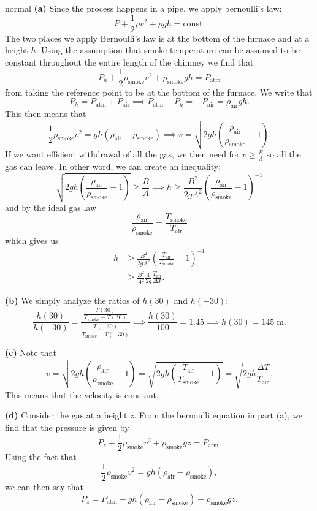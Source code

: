 \begin{solution}{normal}
\textbf{(a)} Since the process happens in a pipe, we apply bernoulli's law:
\[P + \frac{1}{2}\rho v^2 + \rho gh = \text{const.}\]
The two places we apply Bernoulli's law is at the bottom of the furnace and at a height $h$. Using the assumption that smoke temperature can be assumed to be constant throughout the entire length of the chimney we find that 
\[P_h + \frac{1}{2}\rho_{\text{smoke}}v^2 + \rho_{\text{smoke}} gh  = P_{\text{atm}}\]
from taking the reference point to be at the bottom of the furnace. We write that 
\[P_h = P_{\text{atm}} + P_{\text{air}}\implies P_{\text{atm}} - P_h = -P_{\text{air}} = \rho_{\text{air}} gh.\]
This then means that 
\[\frac{1}{2}\rho_{\text{smoke}} v^2 = gh (\rho_{\text{air}} - \rho_{\text{smoke}})\implies v = \sqrt{2gh \left(\frac{\rho_{\text{air}}}{\rho_{\text{smoke}}} - 1\right)}.\]
If we want efficient withdrawal of all the gas, we then need for $v \geq \frac{B}{A}$ so all the gas can leave. In other word, we can create an inequality:
\[\sqrt{2gh \left(\frac{\rho_{\text{air}}}{\rho_{\text{smoke}}} - 1\right)} \geq \frac{B}{A}\implies h \geq \frac{B^2}{2gA^2} \left(\frac{\rho_{\text{air}}}{\rho_{\text{smoke}}} - 1\right)^{-1}\]
and by the ideal gas law 
\[\frac{\rho_{\text{air}}}{\rho_{\text{smoke}}} = \frac{T_{\text{smoke}}}{T_{\text{air}}}\]
which gives us 
\begin{align*}
h &\geq \frac{B^2}{2gA^2} \left(\frac{T_{\text{air}}}{T_{\text{smoke}}} - 1\right)^{-1} \\
&\geq \frac{B^2}{A^2}\frac{1}{2g}\frac{T_{\text{air}}}{\Delta T}.
\end{align*}
\vspace{3mm}

\noindent \textbf{(b)} We simply analyze the ratios of $h(30)$ and $h(-30)$:
\[\frac{h (30)}{h(-30)} = \frac{\frac{T(30)}{T_{\text{smoke}} - T(30)}}{\frac{T(-30)}{T_{\text{smoke}} - T(-30)}}\implies \frac{h(30)}{100} = 1.45\implies h(30) = 145\;\mathrm{m}.\]
\vspace{3mm}

\noindent \textbf{(c)} Note that 
\[ v = \sqrt{2gh \left(\frac{\rho_{\text{air}}}{\rho_{\text{smoke}}} - 1\right)} = \sqrt{2gh \left(\frac{T_{\text{air}}}{T_{\text{smoke}}} - 1\right)} = \sqrt{2gh \frac{\Delta T}{T_{\text{air}}}}.\]
This means that the velocity is constant. 
\vspace{3mm}

\noindent \textbf{(d)} Consider the gas at a height $z$. From the bernoulli equation in part (a), we find that the pressure is given by 
\[P_z + \frac{1}{2}\rho_{\text{smoke}}v^2 + \rho_{\text{smoke}} gz = P_{\text{atm}}.\]
Using the fact that 
\[\frac{1}{2}\rho_{\text{smoke}} v^2 = gh (\rho_{\text{air}} - \rho_{\text{smoke}}),\]
we can then say that 
\[P_z = P_{\text{atm}} - gh (\rho_{\text{air}} - \rho_{\text{smoke}}) - \rho_{\text{smoke}} gz.\]
\vspace{3mm}


\end{solution}
